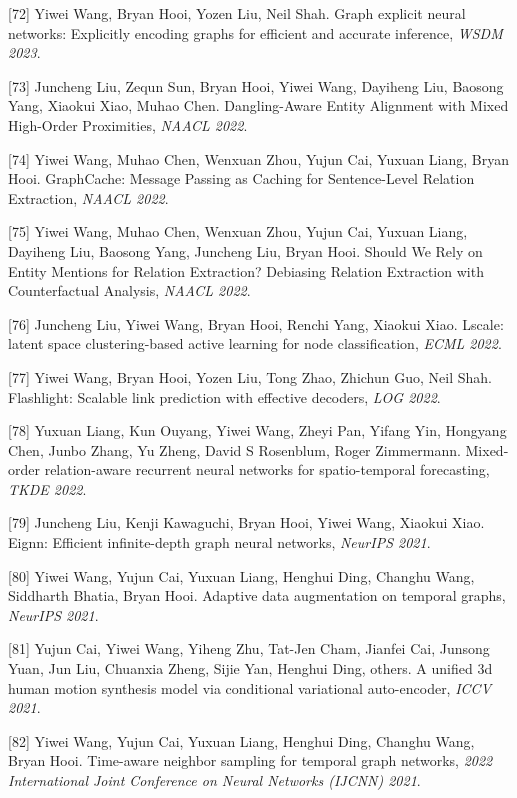 [72] Yiwei Wang, Bryan Hooi, Yozen Liu, Neil Shah. Graph explicit neural networks: Explicitly encoding graphs for efficient and accurate inference, \textit{WSDM 2023}.

[73] Juncheng Liu, Zequn Sun, Bryan Hooi, Yiwei Wang, Dayiheng Liu, Baosong Yang, Xiaokui Xiao, Muhao Chen. Dangling-Aware Entity Alignment with Mixed High-Order Proximities, \textit{NAACL 2022}.

[74] Yiwei Wang, Muhao Chen, Wenxuan Zhou, Yujun Cai, Yuxuan Liang, Bryan Hooi. GraphCache: Message Passing as Caching for Sentence-Level Relation Extraction, \textit{NAACL 2022}.

[75] Yiwei Wang, Muhao Chen, Wenxuan Zhou, Yujun Cai, Yuxuan Liang, Dayiheng Liu, Baosong Yang, Juncheng Liu, Bryan Hooi. Should We Rely on Entity Mentions for Relation Extraction? Debiasing Relation Extraction with Counterfactual Analysis, \textit{NAACL 2022}.

[76] Juncheng Liu, Yiwei Wang, Bryan Hooi, Renchi Yang, Xiaokui Xiao. Lscale: latent space clustering-based active learning for node classification, \textit{ECML 2022}.

[77] Yiwei Wang, Bryan Hooi, Yozen Liu, Tong Zhao, Zhichun Guo, Neil Shah. Flashlight: Scalable link prediction with effective decoders, \textit{LOG 2022}.

[78] Yuxuan Liang, Kun Ouyang, Yiwei Wang, Zheyi Pan, Yifang Yin, Hongyang Chen, Junbo Zhang, Yu Zheng, David S Rosenblum, Roger Zimmermann. Mixed-order relation-aware recurrent neural networks for spatio-temporal forecasting, \textit{TKDE 2022}.

[79] Juncheng Liu, Kenji Kawaguchi, Bryan Hooi, Yiwei Wang, Xiaokui Xiao. Eignn: Efficient infinite-depth graph neural networks, \textit{NeurIPS 2021}.

[80] Yiwei Wang, Yujun Cai, Yuxuan Liang, Henghui Ding, Changhu Wang, Siddharth Bhatia, Bryan Hooi. Adaptive data augmentation on temporal graphs, \textit{NeurIPS 2021}.

[81] Yujun Cai, Yiwei Wang, Yiheng Zhu, Tat-Jen Cham, Jianfei Cai, Junsong Yuan, Jun Liu, Chuanxia Zheng, Sijie Yan, Henghui Ding, others. A unified 3d human motion synthesis model via conditional variational auto-encoder, \textit{ICCV 2021}.

[82] Yiwei Wang, Yujun Cai, Yuxuan Liang, Henghui Ding, Changhu Wang, Bryan Hooi. Time-aware neighbor sampling for temporal graph networks, \textit{2022 International Joint Conference on Neural Networks (IJCNN) 2021}.

